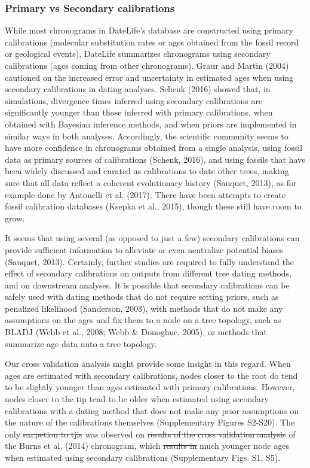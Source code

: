 \documentclass[english,man]{apa6}
\providecommand{\DIFaddtex}[1]{{\protect\color{blue}\uwave{#1}}} %
\providecommand{\DIFdeltex}[1]{{\protect\color{red}\sout{#1}}}                      %
\providecommand{\DIFaddbegin}{} %
\providecommand{\DIFaddend}{} %
\providecommand{\DIFdelbegin}{} %
\providecommand{\DIFdelend}{} %
\providecommand{\DIFadd}[1]{\texorpdfstring{\DIFaddtex{#1}}{#1}} %
\providecommand{\DIFdel}[1]{\texorpdfstring{\DIFdeltex{#1}}{}} %
\newcommand{\DIFscaledelfig}{0.5}
\newlength{\DIFdelgraphicswidth} %
\newlength{\DIFdelgraphicsheight} %
\newcommand{\DIFaddincludegraphics}[2][]{{\color{blue}\fbox{\DIFOincludegraphics[#1]{#2}}}} %
\newcommand{\DIFdelincludegraphics}[2][]{%
\sbox{\DIFdelgraphicsbox}{\DIFOincludegraphics[#1]{#2}}%
\settoboxwidth{\DIFdelgraphicswidth}{\DIFdelgraphicsbox} %
\settoboxtotalheight{\DIFdelgraphicsheight}{\DIFdelgraphicsbox} %
\scalebox{\DIFscaledelfig}{%
\parbox[b]{\DIFdelgraphicswidth}{\usebox{\DIFdelgraphicsbox}\\[-\baselineskip] \rule{\DIFdelgraphicswidth}{0em}}\llap{\resizebox{\DIFdelgraphicswidth}{\DIFdelgraphicsheight}{%
\setlength{\unitlength}{\DIFdelgraphicswidth}%
\begin{picture}(1,1)%
\thicklines\linethickness{2pt} %
{\color[rgb]{1,0,0}\put(0,0){\framebox(1,1){}}}%
{\color[rgb]{1,0,0}\put(0,0){\line( 1,1){1}}}%
{\color[rgb]{1,0,0}\put(0,1){\line(1,-1){1}}}%
\end{picture}%
}\hspace*{3pt}}} %
} %
\DeclareRobustCommand{\DIFaddbegin}{\DIFOaddbegin \let\includegraphics\DIFaddincludegraphics} %
\DeclareRobustCommand{\DIFaddend}{\DIFOaddend \let\includegraphics\DIFOincludegraphics} %
\DeclareRobustCommand{\DIFdelbegin}{\DIFOdelbegin \let\includegraphics\DIFdelincludegraphics} %
\DeclareRobustCommand{\DIFdelend}{\DIFOaddend \let\includegraphics\DIFOincludegraphics} %
\begin{document}
\hypertarget{primary-vs-secondary-calibrations}{%
\subsubsection{Primary vs Secondary calibrations}\label{primary-vs-secondary-calibrations}}

While most chronograms in DateLife's database are constructed using primary calibrations (molecular substitution rates or ages obtained from the fossil record or geological events), DateLife summarizes chronograms using secondary calibrations (ages coming from other chronograms).
Graur and Martin (2004) cautioned on the increased error and uncertainty in estimated ages when using secondary calibrations in dating analyses.
Schenk (2016) showed that, in simulations, divergence times inferred using secondary calibrations are significantly younger than those inferred with primary calibrations, when obtained with Bayesian inference methods, and when priors are implemented in similar ways in both analyses.
Accordingly, the scientific community seems to have more confidence in chronograms obtained from a single analysis, using fossil data as primary sources of calibrations (Schenk, 2016), and using fossils that have been widely discussed and curated as calibrations to date other trees, making sure that all data reflect a coherent evolutionary history (Sauquet, 2013), as for example done by Antonelli et al. (2017).
There have been attempts to create fossil calibration databases (Ksepka et al., 2015), though these still have room to grow.

It seems that using several (as opposed to just a few) secondary calibrations can provide sufficient information to alleviate or even neutralize potential biases (Sauquet, 2013).
Certainly, further studies are required to fully understand the effect of secondary calibrations on outputs from different tree dating methods, and on downstream analyses. It is possible that secondary calibrations can be safely used with dating methods that do not require setting priors, such as penalized likelihood (Sanderson, 2003), with methods that do not make any assumptions on the ages and fix them to a node on a tree topology, such as BLADJ (Webb et al., 2008; Webb \& Donoghue, 2005), or methods that summarize age data unto a tree topology.

Our cross validation analysis might provide some insight in this regard. When ages are estimated with secondary calibrations, nodes closer to the root do tend to be slightly younger than ages estimated with primary calibrations. However, nodes closer to the tip tend to be older when estimated using secondary calibrations with a dating method that does not make any prior assumptions on the nature of the calibrations themselves (Supplementary Figures S2-S20). The only \DIFdelbegin \DIFdel{excpetion to tjis }\DIFdelend \DIFaddbegin \DIFadd{exception to this }\DIFaddend was observed on \DIFdelbegin \DIFdel{results of the cross validation analysis }\DIFdelend \DIFaddbegin \DIFadd{cross validation results }\DIFaddend of the Burns et al. (2014) chronogram, which \DIFdelbegin \DIFdel{results in }\DIFdelend \DIFaddbegin \DIFadd{displays }\DIFaddend much younger node ages when estimated using secondary calibrations (Supplementary Figs. S1, S5).
\end{document}
